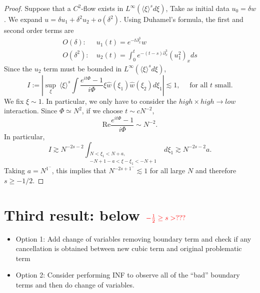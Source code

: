 \documentclass[a4paper, 11pt]{amsart}
\newcommand{\jap}[1]{\langle #1 \rangle}
\theoremstyle{plain}
\theoremstyle{definition}
\theoremstyle{remark}
\newcommand{\5}{\text{V}}
\numberwithin{equation}{section}
\theoremstyle{mytheoremstyle} \newtheorem{nota}[thm]{Remark}
\theoremstyle{mytheoremstyle} \newtheorem{exemplo}[thm]{Example}
\newcommand{\red}{\color{red}}
\begin{document}
{\begin{proof}
 Suppose that a $C^2$-flow exists in $L^\infty(\jap{\xi}^sd\xi)$, Take as initial data $u_0=\delta w$. We expand $u=\delta u_1 + \delta^2 u_2 + o(\delta^2)$. Using Duhamel's formula, the first and second order terms are
 \begin{align}
     O(\delta) :&\  u_1(t)=e^{-t\partial_x^3} w\\
     O(\delta^2) :&\  u_2(t)=\int_0^t e^{-(t-s)\partial_x^3}(u_1^2)_xds
 \end{align}
 Since the $u_2$ term must be bounded in $L^\infty(\jap{\xi}^sd\xi)$,
    $$
    I:=\left|\sup_\xi \ \jap{\xi}^s\int \frac{e^{it\Phi}-1}{i\Phi}\xi \hat{w}(\xi_1)\hat{w}(\xi_2) d\xi_1\right|\lesssim 1,\quad \mbox{ for all }t\mbox{ small.}
    $$
    We fix $\xi\sim 1$. In particular, we only have to consider the $high\times high \to low$ interaction. Since $\Phi\simeq N^2$, if we choose $t\sim cN^{-2}$,
    $$
    \mbox{Re}\frac{e^{it\Phi}-1}{i\Phi} \sim N^{-2}.
    $$
    In particular,
    $$
    I\gtrsim N^{-2s-2}\int_{\substack{N<\xi_1<N+a,\\ -N+1-a<\xi-\xi_1<-N+1}} d\xi_1 \gtrsim N^{-2s-2}a.
    $$
    Taking $a=N^{1^-}$, this implies that $N^{-2s+1^-}\lesssim 1$ for all large $N$ and therefore $s\ge -1/2$.
\end{proof}




}

\section{Third result: below $\red -\frac12\ge s> ???$}



{\red


\begin{itemize}
\item  Option 1: Add change of variables removing boundary term and check if any cancellation is obtained between new cubic term and original problematic term

\item Option 2: Consider performing INF to observe all of the ``bad'' boundary terms and then do change of variables.
\end{itemize}
}
\end{document}
